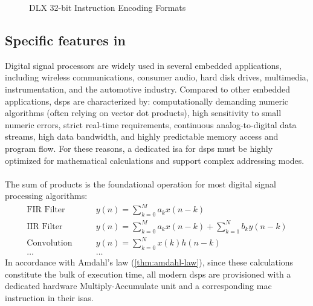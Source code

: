 \begin{figure}[!htbp]
    \caption{DLX 32-bit Instruction Encoding Formats}
    \label{fig:dlx-encoding}
\end{figure}

\subsection{Specific  features in }
Digital signal processors are widely used in several embedded applications, including wireless communications, consumer audio, hard disk drives, multimedia, instrumentation, and the automotive industry. Compared to other embedded applications, \glspl{dsp} are characterized by: computationally demanding numeric algorithms (often relying on vector dot products), high sensitivity to small numeric errors, strict real-time requirements, continuous analog-to-digital data streams, high data bandwidth, and highly predictable memory access and program flow. For these reasons, a dedicated \gls{isa} for \glspl{dsp} must be highly optimized for mathematical calculations and support complex addressing modes.

\paragraph{} 
The sum of products is the foundational operation for most digital signal processing algorithms:
\[
\begin{aligned}
    \text{FIR Filter} &\qquad y(n) = \sum_{k=0}^M a_k x(n-k)\\
    \text{IIR Filter} &\qquad y(n) = \sum_{k=0}^M a_k x(n-k) + \sum_{k=1}^N b_k y(n-k)\\
    \text{Convolution} &\qquad y(n) = \sum_{k=0}^N x(k) h(n-k)\\
    \dots&\qquad\dots
\end{aligned}
\]
In accordance with Amdahl's law (\cref{thm:amdahl-law}), since these calculations constitute the bulk of execution time, all modern \glspl{dsp} are provisioned with a dedicated hardware Multiply-Accumulate unit and a corresponding \gls{mac} instruction in their \glspl{isa}.

